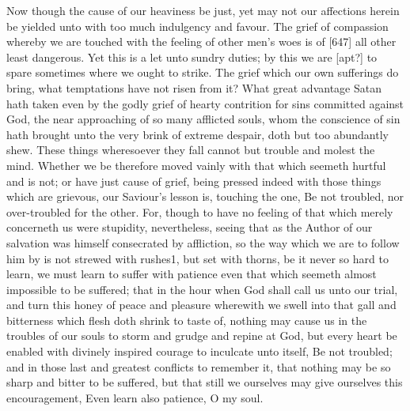 Now though the cause of our heaviness be just, yet may not our affections herein be yielded unto with too much indulgency and favour. The grief of compassion whereby we are touched with the feeling of other men’s woes is of [647] all other least dangerous. Yet this is a let unto sundry duties; by this we are [apt?] to spare sometimes where we ought to strike. The grief which our own sufferings do bring, what temptations have not risen from it? What great advantage Satan hath taken even by the godly grief of hearty contrition for sins committed against God, the near approaching of so many afflicted souls, whom the conscience of sin hath brought unto the very brink of extreme despair, doth but too abundantly shew. These things wheresoever they fall cannot but trouble and molest the mind. Whether we be therefore moved vainly with that which seemeth hurtful and is not; or have just cause of grief, being pressed indeed with those things which are grievous, our Saviour’s lesson is, touching the one, Be not troubled, nor over-troubled for the other. For, though to have no feeling of that which merely concerneth us were stupidity, nevertheless, seeing that as the Author of our salvation was himself consecrated by affliction, so the way which we are to follow him by is not strewed with rushes1, but set with thorns, be it never so hard to learn, we must learn to suffer with patience even that which seemeth almost impossible to be suffered; that in the hour when God shall call us unto our trial, and turn this honey of peace and pleasure wherewith we swell into that gall and bitterness which flesh doth shrink to taste of, nothing may cause us in the troubles of our souls to storm and grudge and repine at God, but every heart be enabled with divinely inspired courage to inculcate unto itself, Be not troubled; and in those last and greatest conflicts to remember it, that nothing may be so sharp and bitter to be suffered, but that still we ourselves may give ourselves this encouragement, Even learn also patience, O my soul.

